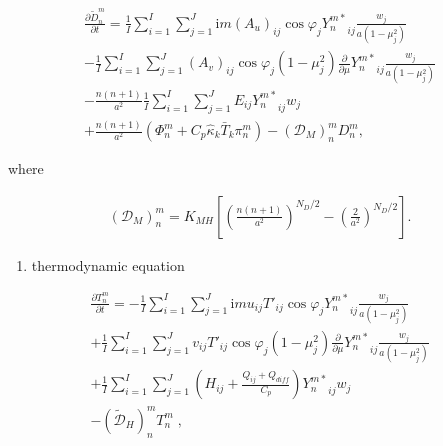 \begin{eqnarray}
  \frac{\partial{\tilde{D}_n^m}}{\partial {t}}
   =  \frac{1}{I} \sum_{i=1}^{I} \sum_{j=1}^{J}  
          \mathrm{i}m (A_u)_{ij} \cos\varphi_j
          {Y_n^{m *}}_{ij}
         \frac{w_j}{a(1-\mu_j^{2})}
          \\
    -    \frac{1}{I} \sum_{i=1}^{I} \sum_{j=1}^{J}  
          (A_v)_{ij} \cos\varphi_j
          (1-\mu_j^2)
          \frac{\partial }{\partial \mu} {Y_n^{m *}}_{ij}
          \frac{w_j}{a(1-\mu_j^{2})}
          \\
    -   \frac{n(n+1)}{a^{2}}
         \frac{1}{I} \sum_{i=1}^{I} \sum_{j=1}^{J}  
          E_{ij} {Y_n^{m *}}_{ij} w_j
          \\
    +   \frac{n(n+1)}{a^{2}}
          ( \Phi_n^m + C_{p} \hat{\kappa}_k \bar{T}_k \pi_n^m )
          -  ({\mathcal D}_M)_n^m D_n^m  ,
\end{eqnarray}

where

\begin{eqnarray}
({\mathcal D}_M)_n^m = K_{MH} \left[
                            \left( \frac{n(n+1)}{a^{2}} \right)^{N_D/2}
                            - \left( \frac{2}{a^2} \right)^{N_D/2}
                            \right]  .
\end{eqnarray}

\begin{enumerate}
\def\labelenumi{\arabic{enumi}.}
\setcounter{enumi}{2}
\tightlist
\item
  thermodynamic equation
\end{enumerate}

\begin{eqnarray}
  \frac{\partial{T_n^m}}{\partial {t}}
   =  - \frac{1}{I} \sum_{i=1}^{I} \sum_{j=1}^{J}  
          \mathrm{i}m u_{ij} T'_{ij} \cos\varphi_j
          {Y_n^{m *}}_{ij}
         \frac{w_j}{a(1-\mu_j^{2})}
          \\
     + \frac{1}{I} \sum_{i=1}^{I} \sum_{j=1}^{J}  
          v_{ij} T'_{ij} \cos\varphi_j
          (1-\mu_j^2)
          \frac{\partial }{\partial \mu} {Y_n^{m *}}_{ij}
          \frac{w_j}{a(1-\mu_j^{2})}
          \\
     + \frac{1}{I} \sum_{i=1}^{I} \sum_{j=1}^{J}  
          \left( H_{ij} + \frac{Q_{ij}+Q_{diff}}{C_{p}} \right)
          {Y_n^{m *}}_{ij} w_j
          \\
     - (\tilde{\mathcal D}_H)_n^m T_n^m \; ,
\end{eqnarray}

